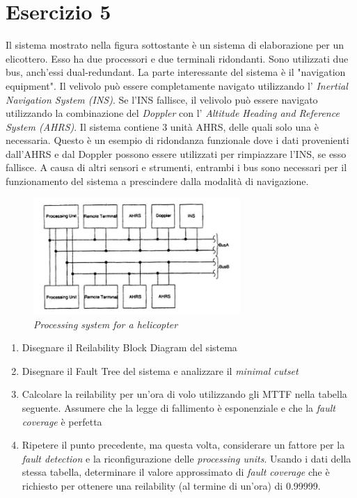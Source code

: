 \section{Esercizio 5}
Il sistema mostrato nella figura sottostante è un sistema di elaborazione per un elicottero. Esso ha due processori e due terminali ridondanti. Sono utilizzati due bus, anch'essi dual-redundant. La parte interessante del sistema è il "navigation equipment". Il velivolo può essere completamente navigato utilizzando l' \textit{Inertial Navigation System (INS)}. Se l'INS fallisce, il velivolo può essere navigato utilizzando la combinazione del \textit{Doppler} con l' \textit{Altitude Heading and Reference System (AHRS)}. Il sistema contiene 3 unità AHRS, delle quali solo una è necessaria. Questo è un esempio di ridondanza funzionale dove i dati provenienti dall'AHRS e dal Doppler possono essere utilizzati per rimpiazzare l'INS, se esso fallisce. A causa di altri sensori e strumenti, entrambi i bus sono necessari per il funzionamento del sistema a prescindere dalla modalità di navigazione.
\begin{figure}[H]
	\centering
	\includegraphics[width=0.7\textwidth]{img/hw5/es5_traccia.png}
	\caption{\textit{Processing system for a helicopter}}
\end{figure}
\begin{enumerate}[ A) ]
	\item Disegnare il Reilability Block Diagram del sistema
	\item Disegnare il Fault Tree del sistema e analizzare il \textit{minimal cutset}
	\item Calcolare la reilability per un'ora di volo utilizzando gli MTTF nella tabella seguente. Assumere che la legge di fallimento è esponenziale e che la \textit{fault coverage} è perfetta
	\item Ripetere il punto precedente, ma questa volta, considerare un fattore per la \textit{fault detection} e la riconfigurazione delle \textit{processing units}. Usando i dati della stessa tabella, determinare il valore approssimato di \textit{fault coverage} che è richiesto per ottenere una reilability (al termine di un'ora) di 0.99999.
\end{enumerate}
